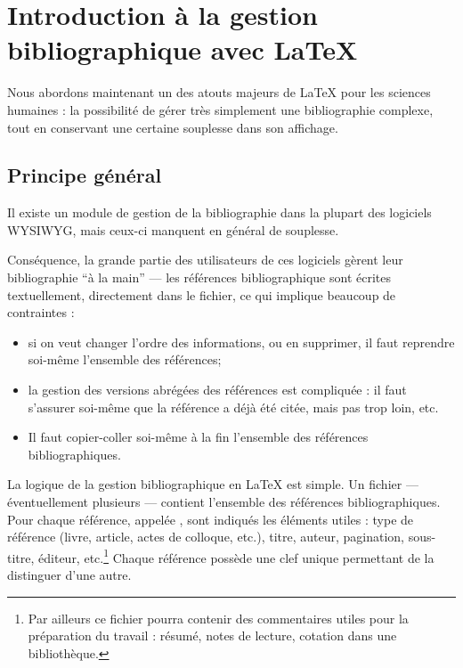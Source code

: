 \chapter[Introduction]{Introduction à la gestion bibliographique avec \LaTeX{}}
\begin{intro}
Nous abordons maintenant un des atouts majeurs de \LaTeX{} pour les sciences humaines : la possibilité de gérer très simplement une bibliographie complexe, tout en conservant une certaine souplesse dans son affichage.

\end{intro}
\section{Principe général}



Il existe un module de gestion de la bibliographie dans la plupart des logiciels WYSIWYG, mais ceux-ci manquent en général de souplesse.

Conséquence, la grande partie des utilisateurs de ces logiciels gèrent leur bibliographie \enquote{à la main} --- les références bibliographique sont écrites textuellement, directement dans le fichier, ce qui implique beaucoup de contraintes  :
\begin{itemize}
\item si on veut changer l'ordre des informations, ou en supprimer, il faut reprendre soi-même l'ensemble des références;
\item la gestion des versions abrégées des références est  compliquée :  il faut s'assurer soi-même que la référence a déjà été citée, mais pas trop loin, etc. 
\item Il faut copier-coller soi-même à la fin l'ensemble des références bibliographiques. 
\end{itemize}

La logique de la gestion bibliographique en \LaTeX{} est  simple. Un fichier   --- éventuellement plusieurs --- contient l'ensemble des références bibliographiques. Pour chaque référence, appelée , sont indiqués les éléments utiles :  type de référence (livre, article, actes de colloque, etc.), titre, auteur, pagination, sous-titre, éditeur, etc.\footnote{Par ailleurs ce fichier pourra contenir des commentaires utiles pour la préparation du travail : résumé, notes de lecture, cotation dans une bibliothèque.} Chaque référence possède une clef unique permettant de la distinguer d'une autre.

